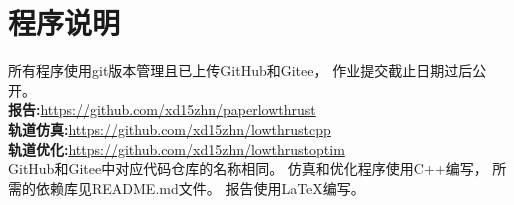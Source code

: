 \section{程序说明}
所有程序使用git版本管理且已上传GitHub和Gitee，
作业提交截止日期过后公开。\\
\textbf{报告:}\url{https://github.com/xd15zhn/paperlowthrust} \\
\textbf{轨道仿真:}\url{https://github.com/xd15zhn/lowthrustcpp} \\
\textbf{轨道优化:}\url{https://github.com/xd15zhn/lowthrustoptim} \\
GitHub和Gitee中对应代码仓库的名称相同。
仿真和优化程序使用C++编写，
所需的依赖库见README.md文件。
报告使用\LaTeX 编写。
